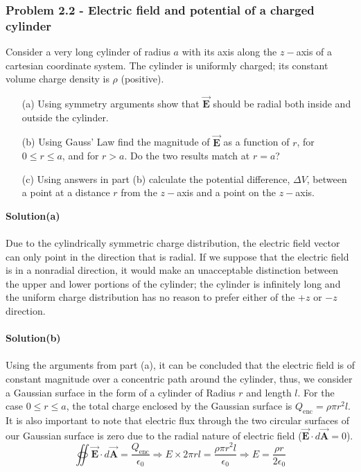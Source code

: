 \documentclass{article}
\begin{document}
\subsubsection*{Problem 2.2 - Electric field and potential of a charged cylinder}
Consider a very long cylinder of radius $a$ with its axis along the $z-$axis of a cartesian coordinate system. The cylinder is uniformly charged; its constant volume charge density is $\rho$ (positive).
\begin{enumerate}
\item[(a)]Using symmetry arguments show that $\Vec{\boldsymbol{E}}$ should be radial both inside and outside the cylinder.
\item[(b)]Using Gauss' Law find the magnitude of $\Vec{\boldsymbol{E}}$ as a function of $r$, for $0\leq r\leq a$, and for $r>a$. Do the two results match at $r=a$?
\item[(c)]Using answers in part (b) calculate the potential difference, $\Delta V$, between a point at a distance $r$ from the $z-$axis and a point on the $z-$axis.
\end{enumerate}
\textbf{Solution(a)}
\\
\\Due to the cylindrically symmetric charge distribution, the electric field vector can only point in the direction that is radial. If we suppose that the electric field is in a nonradial direction, it would make an unacceptable distinction between the upper and lower portions of the cylinder; the cylinder is infinitely long and the uniform charge distribution has no reason to prefer either of the +$z$ or $-z$ direction.
\\
\\\textbf{Solution(b)}
\\
\\Using the arguments from part (a), it can be concluded that the electric field is of constant magnitude over a concentric path around the cylinder, thus, we consider a Gaussian surface in the form of a cylinder of Radius $r$ and length $l$. For the case $0\leq r\leq a$, the total charge enclosed by the Gaussian surface is $Q_{\text{enc}}=\rho\pi r^2l$. It is also important to note that electric flux through the two circular surfaces of our Gaussian surface is zero due to the radial nature of electric field ($\Vec{\boldsymbol{E}}\cdot d\Vec{\boldsymbol{A}}=0$).
\[\oiint\Vec{\boldsymbol{E}}\cdot d\Vec{\boldsymbol{A}}=\frac{Q_{\text{enc}}}{\epsilon_0}\Rightarrow E\times2\pi rl=\frac{\rho\pi r^2l}{\epsilon_0}\Rightarrow E=\frac{\rho r}{2\epsilon_0}\]
\end{document}
